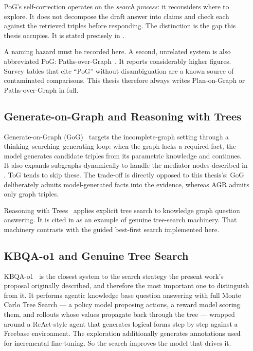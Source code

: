 PoG's self-correction operates on the \emph{search process}: it reconsiders
where to explore. It does not decompose the draft answer into claims and check
each against the retrieved triples before responding. The distinction is the
gap this thesis occupies. It is stated precisely in .

A naming hazard must be recorded here. A second, unrelated system is also
abbreviated PoG: Paths-over-Graph~\cite{tan2024paths}. It reports considerably
higher figures. Survey tables that cite ``PoG'' without disambiguation are a
known source of contaminated comparisons. This thesis therefore always writes
Plan-on-Graph or Paths-over-Graph in full.

\subsection{Generate-on-Graph and Reasoning with Trees}

Generate-on-Graph (GoG)~\cite{xu2024generate} targets the incomplete-graph
setting through a thinking--searching--generating loop: when the graph lacks a
required fact, the model generates candidate triples from its parametric
knowledge and continues. It also expands subgraphs dynamically to handle the
mediator nodes described in . ToG tends to skip these.
The trade-off is directly opposed to this thesis's: GoG deliberately admits
model-generated facts into the evidence, whereas AGR admits only graph triples.

Reasoning with Trees~\cite{shen2025reasoning} applies explicit tree search to
knowledge graph question answering. It is cited in 
as an example of genuine tree-search machinery. That machinery contrasts with
the guided best-first search implemented here.

\subsection{KBQA-o1 and Genuine Tree Search}\label{sec:kbqao1}

KBQA-o1~\cite{luo2025kbqao1} is the closest system to the search strategy the
present work's proposal originally described, and therefore the most important
one to distinguish from it. It performs agentic knowledge base question
answering with full Monte Carlo Tree Search --- a policy model
proposing actions, a reward model scoring them, and rollouts whose values
propagate back through the tree --- wrapped around a ReAct-style agent that
generates logical forms step by step against a Freebase environment. The
exploration additionally generates annotations used for incremental
fine-tuning. So the search improves the model that drives it.

